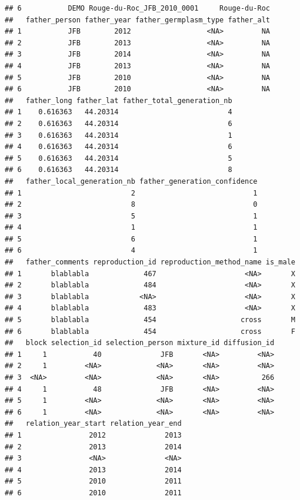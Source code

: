 \documentclass{article}\usepackage[]{graphicx}\usepackage[]{color}
\makeatletter
\newenvironment{kframe}{%
 \def\at@end@of@kframe{}%
 \ifinner\ifhmode%
  \def\at@end@of@kframe{\end{minipage}}%
  \begin{minipage}{\columnwidth}%
 \fi\fi%
 \def\FrameCommand##1{\hskip\@totalleftmargin \hskip-\fboxsep
 \colorbox{shadecolor}{##1}\hskip-\fboxsep
     \hskip-\linewidth \hskip-\@totalleftmargin \hskip\columnwidth}%
 \MakeFramed {\advance\hsize-\width
   \@totalleftmargin\z@ \linewidth\hsize
   \@setminipage}}%
 {\par\unskip\endMakeFramed%
 \at@end@of@kframe}
\newenvironment{knitrout}{}{} %
\makeatother
\begin{document}
\begin{itemize}
\begin{knitrout}
\begin{kframe}
\begin{verbatim}
## 6           DEMO Rouge-du-Roc_JFB_2010_0001     Rouge-du-Roc
##   father_person father_year father_germplasm_type father_alt
## 1           JFB        2012                  <NA>         NA
## 2           JFB        2013                  <NA>         NA
## 3           JFB        2014                  <NA>         NA
## 4           JFB        2013                  <NA>         NA
## 5           JFB        2010                  <NA>         NA
## 6           JFB        2010                  <NA>         NA
##   father_long father_lat father_total_generation_nb
## 1    0.616363   44.20314                          4
## 2    0.616363   44.20314                          6
## 3    0.616363   44.20314                          1
## 4    0.616363   44.20314                          6
## 5    0.616363   44.20314                          5
## 6    0.616363   44.20314                          8
##   father_local_generation_nb father_generation_confidence
## 1                          2                            1
## 2                          8                            0
## 3                          5                            1
## 4                          1                            1
## 5                          6                            1
## 6                          4                            1
##   father_comments reproduction_id reproduction_method_name is_male
## 1       blablabla             467                     <NA>       X
## 2       blablabla             484                     <NA>       X
## 3       blablabla            <NA>                     <NA>       X
## 4       blablabla             483                     <NA>       X
## 5       blablabla             454                    cross       M
## 6       blablabla             454                    cross       F
##   block selection_id selection_person mixture_id diffusion_id
## 1     1           40              JFB       <NA>         <NA>
## 2     1         <NA>             <NA>       <NA>         <NA>
## 3  <NA>         <NA>             <NA>       <NA>          266
## 4     1           48              JFB       <NA>         <NA>
## 5     1         <NA>             <NA>       <NA>         <NA>
## 6     1         <NA>             <NA>       <NA>         <NA>
##   relation_year_start relation_year_end
## 1                2012              2013
## 2                2013              2014
## 3                <NA>              <NA>
## 4                2013              2014
## 5                2010              2011
## 6                2010              2011
\end{verbatim}
\end{kframe}
\end{knitrout}



\end{itemize}
\end{document}
